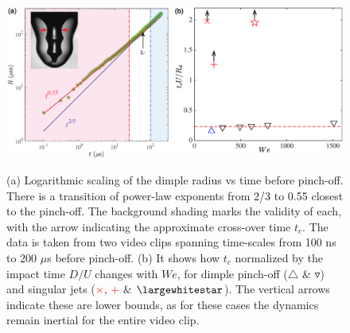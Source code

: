 \documentclass[10pt, a4paper]{article}
\begin{document}
\begin{figure}[!ht]
  \centering
     \includegraphics[width=0.8\linewidth]{figures/PinchoffMultiDimple_Rt_loglog_ICTAM.eps}\vspace{-0.15in}\\
	\caption{\fontsize{9}{9}\selectfont (a) Logarithmic scaling of the dimple radius vs time before pinch-off. 
	There is a transition of power-law exponents from 2/3 to 0.55 closest to the pinch-off.
	The background shading marks the validity of each, with the arrow indicating the approximate cross-over time $t_c$.  
	The data is taken from two video clips spanning time-scales from 100 ns to 200 $\mu$s before pinch-off.  
	(b) It shows how $t_c$ normalized by the impact time $D/U$ changes with $We$, 
	for dimple pinch-off (\textcolor{mypink2}{$\triangle$} \& $\triangledown$) and singular jets (\textcolor{red}{$\times$}, \textcolor{red}{$\plus$} \& \textcolor{red}{$\largewhitestar$}).
	The vertical arrows indicate these are lower bounds, as for these cases the dynamics remain inertial for the entire video clip.}
  \label{Fig_5}
\end{figure}

\end{document}
